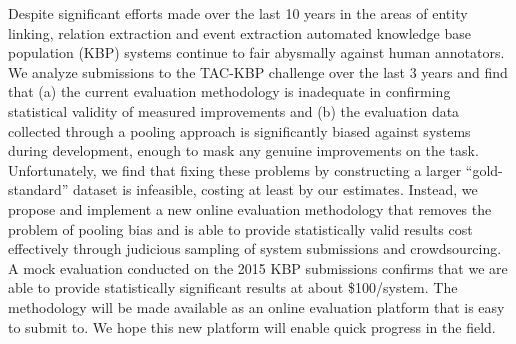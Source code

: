 Despite significant efforts made over the last 10 years in the areas of entity linking, relation extraction and event extraction automated knowledge base population (KBP) systems continue to fair abysmally  against human annotators.
We analyze submissions to the TAC-KBP challenge over the last 3 years and find that (a) the current evaluation methodology is inadequate in confirming statistical validity of measured improvements and (b) the evaluation data collected through a pooling approach is significantly biased against systems during development, enough to mask any genuine improvements on the task.
Unfortunately, we find that fixing these problems by constructing a larger ``gold-standard'' dataset is infeasible, costing at least  by our estimates.
Instead, we propose and implement a new online evaluation methodology that removes the problem of pooling bias and is able to provide statistically valid results cost effectively through judicious sampling of system submissions and crowdsourcing.
A mock evaluation conducted on the 2015 KBP submissions confirms that we are able to provide statistically significant results at about \$100/system.
The methodology will be made available as an online evaluation platform that is easy to submit to.
We hope this new platform will enable quick progress in the field.

